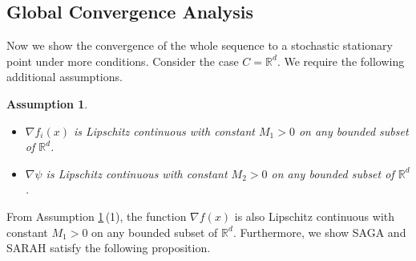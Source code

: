\documentclass[letterpaper]{article} %
\newtheorem{assumption}{Assumption}
\begin{document}
	\subsection{Global Convergence Analysis}
	Now we show the convergence of  the whole sequence to a  stochastic stationary point under more conditions.
	Consider the case  $C=\mathbb{R}^{d}$.
	We require the following additional assumptions.
	\begin{assumption}\label{assume_03}
		\begin{itemize}
			\item $\nabla f_{i}(x)$ is Lipschitz continuous with constant $M_{1} > 0$ on any bounded subset of $\mathbb{R}^{d}$.
			\item   $\nabla \psi $ is Lipschitz continuous with  constant $M_{2} > 0$ on any bounded subset of $\mathbb{R}^{d}$.
		\end{itemize}
	\end{assumption}
	From Assumption \ref{assume_03}\,(1), the function $\nabla f(x)$ is also Lipschitz continuous with constant $M_{1} > 0$ on any bounded subset of $\mathbb{R}^{d}$.
	Furthermore, we show SAGA \cite{DefazioBL14} and SARAH \cite{NguyenLST17} satisfy  the following proposition.
\end{document}
